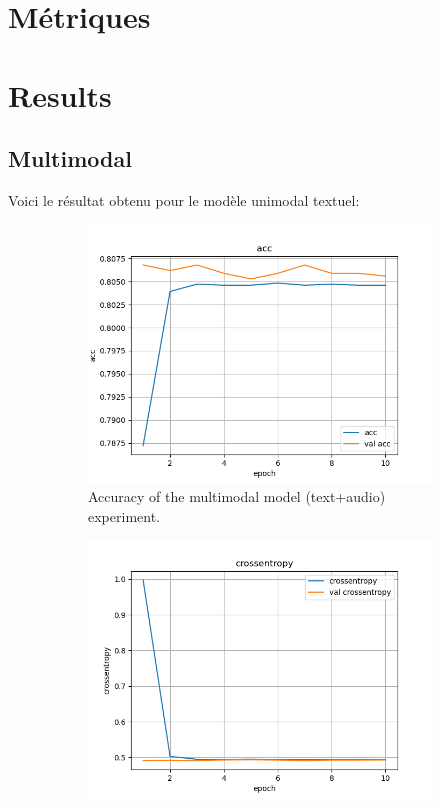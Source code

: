 \documentclass[a4paper]{article}
\begin{document}
\section{Métriques}

\section{Results}

\subsection{Multimodal}

Voici le résultat obtenu pour le modèle unimodal textuel:

\begin{figure}[h]
    \centering
    \begin{subfigure}{0.45\textwidth}
        \includegraphics[width=\textwidth]{acc_multi.png}
        \caption{Accuracy of the multimodal model (text+audio) experiment.}
        \label{fig:multi_1_acc}
    \end{subfigure}
    \hfill
    \begin{subfigure}{0.45\textwidth}
        \includegraphics[width=\textwidth]{crossentropy_multi.png}

\end{subfigure}
\end{figure}
\end{document}
